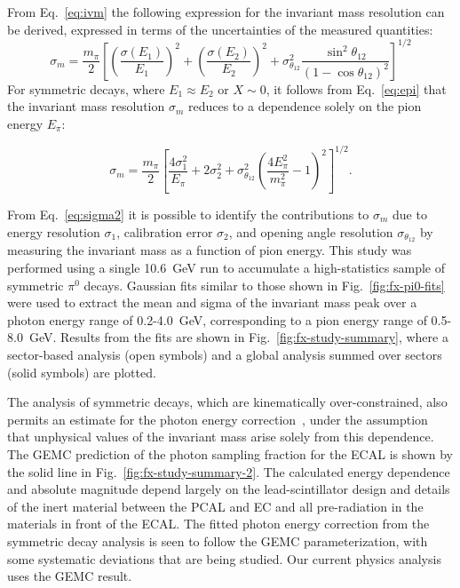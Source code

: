 From Eq.~\ref{eq:ivm} the following expression for the invariant mass resolution can be derived, expressed in
terms of the uncertainties of the measured quantities:
\begin{equation}
  \sigma_m = \frac{m_{\pi}}{2}\left[\left(\frac{\sigma(E_1)}{E_1}\right)^2 \!\! + 
    \left(\frac{\sigma(E_2)}{E_2}\right)^2 \!\!
    + \sigma^2_{\theta_{12}}\frac{\sin^2 \theta_{12}}{(1-\cos \theta_{12})^2}\right]^{1/2}
\label{eq:sigmam1}
\end{equation}
For symmetric decays, where $E_1 \approx E_2$ or $X\sim 0$, it follows from Eq.~\ref{eq:epi} that the invariant
mass resolution $\sigma_m$ reduces to a dependence solely on the pion energy $E_{\pi}$:

\begin{equation}
  \sigma_m = \frac{m_\pi}{2}\left[\frac{4 \sigma^2_1}{E_\pi} + 2 \sigma^2_2 +
    \sigma^2_{\theta_{12}}\left(\frac{4 E^2_\pi}{m^2_\pi}-1\right)^2\right]^{1/2}.
\label{eq:sigma2}
\end{equation}

From Eq.~\ref{eq:sigma2} it is possible to identify the contributions to $\sigma_m$ due to energy resolution
$\sigma_1$, calibration error $\sigma_2$, and opening angle resolution $\sigma_{\theta_{12}}$ by measuring the
invariant mass as a function of pion energy. This study was performed using a single 10.6~GeV run to accumulate
a high-statistics sample of symmetric $\pi^{0}$ decays. Gaussian fits similar to those shown in
Fig.~\ref{fig:fx-pi0-fits} were used to extract the mean and sigma of the invariant mass peak over a photon energy
range of 0.2-4.0~GeV, corresponding to a pion energy range of 0.5-8.0~GeV. Results from the fits are shown in
Fig.~\ref{fig:fx-study-summary}, where a sector-based analysis (open symbols) and a global analysis summed over
sectors (solid symbols) are plotted.  

The analysis of symmetric decays, which are kinematically over-constrained, also permits an estimate for the photon
energy correction~\cite{2006015}, under the assumption that unphysical values of the invariant mass arise solely
from this dependence. The GEMC prediction of the photon sampling fraction for the ECAL is shown by the solid line
in Fig.~\ref{fig:fx-study-summary-2}. The calculated energy dependence and absolute magnitude depend largely on
the lead-scintillator design and details of the inert material between the PCAL and EC and all pre-radiation in the
materials in front of the ECAL. The fitted photon energy correction from the symmetric decay analysis is seen to
follow the GEMC parameterization, with some systematic deviations that are being studied. Our current physics
analysis uses the GEMC result.

